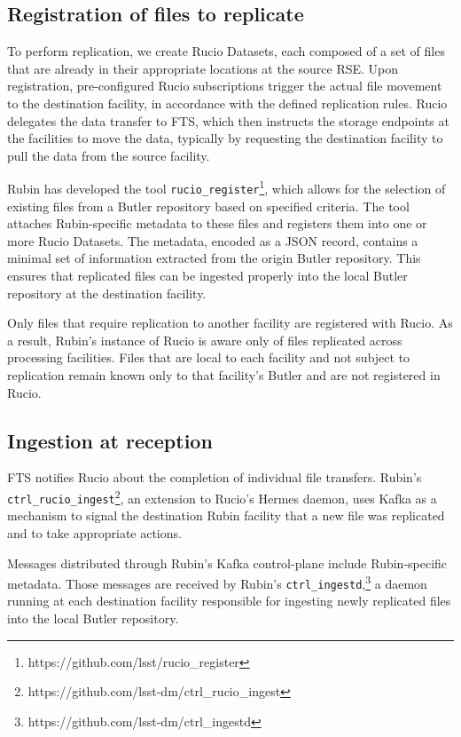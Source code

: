 \documentclass{webofc}
\begin{document}
\subsection{Registration of files to replicate}
\label{registration}

To perform replication, we create Rucio Datasets, each composed of a set of files that are already in their appropriate locations at the source RSE. Upon registration, pre-configured Rucio subscriptions trigger the actual file movement to the destination facility, in accordance with the defined replication rules. Rucio delegates the data transfer to FTS, which then instructs the storage endpoints at the facilities to move the data, typically by requesting the destination facility to pull the data from the source facility.

Rubin has developed the tool \texttt{rucio\_register}\footnote{https://github.com/lsst/rucio\_register}, which allows for the selection of existing files from a Butler repository based on specified criteria. The tool attaches Rubin-specific metadata to these files and registers them into one or more Rucio Datasets. The metadata, encoded as a JSON record, contains a minimal set of information extracted from the origin Butler repository. This ensures that replicated files can be ingested properly into the local Butler repository at the destination facility.

Only files that require replication to another facility are registered with Rucio. As a result, Rubin's instance of Rucio is aware only of files replicated across processing facilities. Files that are local to each facility and not subject to replication remain known only to that facility's Butler and are not registered in Rucio.

\subsection{Ingestion at reception}
\label{ingestion}

FTS notifies Rucio about the completion of individual file transfers. Rubin's \texttt{ctrl\_rucio\_ingest}\footnote{https://github.com/lsst-dm/ctrl\_rucio\_ingest}, an extension to Rucio's Hermes daemon, uses Kafka as a mechanism to signal the destination Rubin facility that a new file was replicated and to take appropriate actions.

Messages distributed through Rubin's Kafka control-plane include Rubin-specific metadata. Those messages are received by Rubin's \texttt{ctrl\_ingestd},\footnote{https://github.com/lsst-dm/ctrl\_ingestd} a daemon running at each destination facility responsible for ingesting newly replicated files into the local Butler repository.
\end{document}
